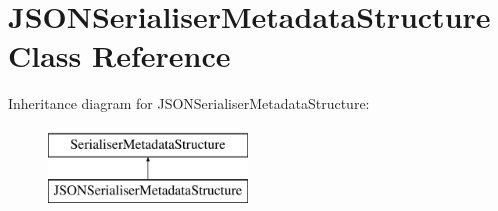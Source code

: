 \hypertarget{class_j_s_o_n_serialiser_metadata_structure}{}\section{J\+S\+O\+N\+Serialiser\+Metadata\+Structure Class Reference}
\label{class_j_s_o_n_serialiser_metadata_structure}
Inheritance diagram for J\+S\+O\+N\+Serialiser\+Metadata\+Structure\+:\begin{figure}[H]
\begin{center}
\leavevmode
\includegraphics[height=2.000000cm]{class_j_s_o_n_serialiser_metadata_structure}
\end{center}
\end{figure}
